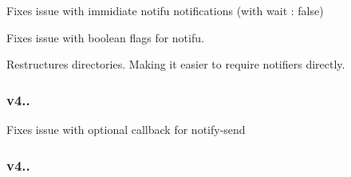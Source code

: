 \begin{DoxyEnumerate}
\item Fixes issue with immidiate notifu notifications (with {\ttfamily wait \+: false})
\item Fixes issue with boolean flags for notifu.
\item Restructures directories. Making it easier to require notifiers directly.
\end{DoxyEnumerate}

\subsubsection*{{\ttfamily v4..}}


\begin{DoxyEnumerate}
\item Fixes issue with optional callback for notify-\/send
\end{DoxyEnumerate}

\subsubsection*{{\ttfamily v4..}}

